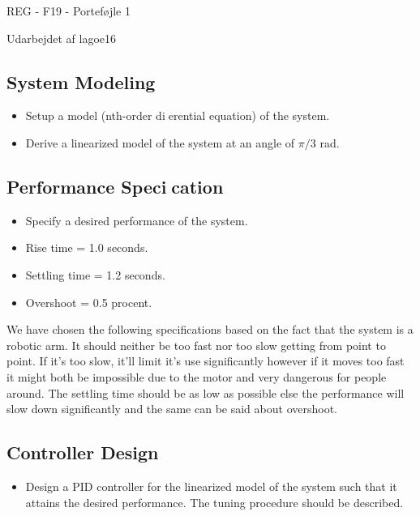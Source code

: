 \documentclass[12pt]{article}
\begin{document}
\raggedright
\huge
REG - F19 - Porteføjle 1 \linebreak
\normalsize

\large
Udarbejdet af lagoe16

\subsection*{System Modeling}

\begin{itemize}
  \item Setup a model (nth-order dierential equation) of the system.
  \item Derive a linearized model of the system at an angle of $\pi/3$ rad.
\end{itemize}

\subsection*{Performance Specication}

\begin{itemize}
  \item Specify a desired performance of the system.
\end{itemize}

\begin{itemize}
  \item Rise time = 1.0 seconds.
  \item Settling time = 1.2 seconds.
  \item Overshoot = 0.5 procent.

\end{itemize}
We have chosen the following specifications based on the fact that the system is a robotic arm. It should neither be too fast nor too slow getting from point to point. If it's too slow, it'll limit it's use significantly however if it moves too fast it might both be impossible due to the motor and very dangerous for people around. The settling time should be as low as possible else the performance will slow down significantly and the same can be said about overshoot.
\subsection*{Controller Design}
\begin{itemize}
  \item Design a PID controller for the linearized model of the system such that it attains the desired performance. The tuning procedure should be described.
\end{itemize}
\end{document}
